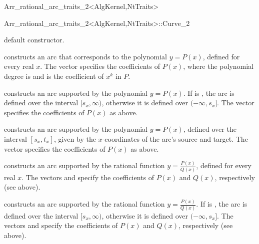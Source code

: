 \begin{ccRefClass}{Arr_rational_arc_traits_2<AlgKernel,NtTraits>}
\begin{ccClass}{Arr_rational_arc_traits_2<AlgKernel,NtTraits>::Curve_2}

\ccCreation
{}

  {default constructor.}

  {constructs an arc that corresponds to the polynomial $y = P(x)$, defined
   for every real $x$. The vector  specifies the coefficients
   of $P(x)$, where the polynomial degree is  and
    is the coefficient of $x^k$ in $P$.}

  {constructs an arc supported by the polynomial $y = P(x)$. If
    is , the arc is defined over the interval
   $[s_x, \infty)$, otherwise it is defined over $(-\infty, s_x]$.
   The vector  specifies the coefficients of $P(x)$ as above.
   }

  {constructs an arc supported by the polynomial $y = P(x)$, defined over
   the interval $[s_x, t_x]$, given by the $x$-coordinates of the arc's
   source and target. The vector  specifies the coefficients
   of $P(x)$ as above.
   }

  {constructs an arc supported by the rational function
   $y = \frac{P(x)}{Q(x)}$,  defined for every real $x$.
   The vectors  and  specify the coefficients
   of $P(x)$ and $Q(x)$, respectively (see above).}


  {constructs an arc supported by the rational function
   $y = \frac{P(x)}{Q(x)}$. If  is , the arc is
   defined over the interval $[s_x, \infty)$, otherwise it is defined
   over $(-\infty, s_x]$.
   The vectors  and  specify the coefficients
   of $P(x)$ and $Q(x)$, respectively (see above).}


\end{ccClass}
\end{ccRefClass}
